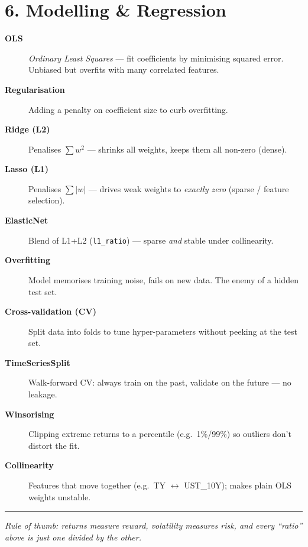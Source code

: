 \documentclass[10pt]{article}
\newcommand{\term}[1]{\textcolor{term}{\textbf{#1}}}
\begin{document}
\section{6. Modelling \& Regression}
\begin{description}
\item[\term{OLS}] \emph{Ordinary Least Squares} — fit coefficients by minimising squared error. Unbiased but
overfits with many correlated features.
\item[\term{Regularisation}] Adding a penalty on coefficient size to curb overfitting.
\item[\term{Ridge (L2)}] Penalises $\sum w^2$ — shrinks all weights, keeps them all non-zero (dense).
\item[\term{Lasso (L1)}] Penalises $\sum|w|$ — drives weak weights to \emph{exactly zero} (sparse / feature selection).
\item[\term{ElasticNet}] Blend of L1+L2 (\texttt{l1\_ratio}) — sparse \emph{and} stable under collinearity.
\item[\term{Overfitting}] Model memorises training noise, fails on new data. The enemy of a hidden test set.
\item[\term{Cross-validation (CV)}] Split data into folds to tune hyper-parameters without peeking at the test set.
\item[\term{TimeSeriesSplit}] Walk-forward CV: always train on the past, validate on the future — no leakage.
\item[\term{Winsorising}] Clipping extreme returns to a percentile (e.g.\ 1\%/99\%) so outliers don't distort the fit.
\item[\term{Collinearity}] Features that move together (e.g.\ TY $\leftrightarrow$ UST\_10Y); makes plain OLS weights unstable.
\end{description}

\vspace{4pt}\hrule\vspace{3pt}
\begin{center}\small\textit{Rule of thumb: returns measure reward, volatility measures risk, and every
``ratio'' above is just one divided by the other.}\end{center}
\end{document}
